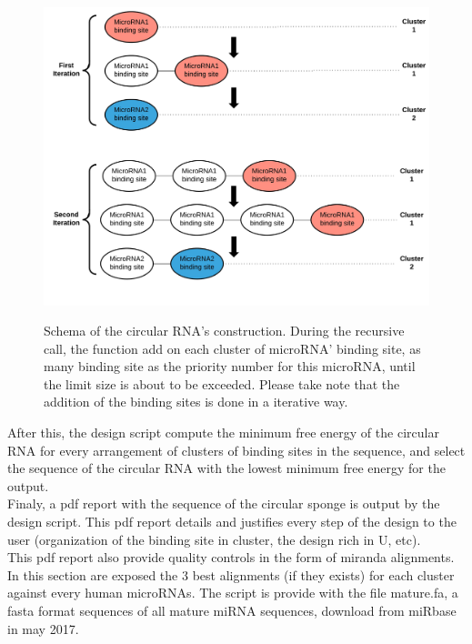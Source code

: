 \documentclass[a4paper,12pt]{report}
\begin{document}
\begin{figure}[H]
	\centering
	{\includegraphics[width=1\textwidth]{circular1(1).jpeg}}
	\caption{Schema of the circular RNA's construction. During the recursive call, the function add on each cluster of microRNA' binding site, as many binding site as the priority number for this microRNA, until the limit size is about to be exceeded. Please take note that the addition of the binding sites is done in a iterative way.}
\end{figure}


After this, the design script compute the minimum free energy of the circular RNA for every arrangement of clusters of binding sites in the sequence, and select the sequence of the circular RNA with the lowest minimum free energy for the output. \\



Finaly, a pdf report with the sequence of the circular sponge is output by the design script. This pdf report details and justifies every step of the design to the user (organization of the binding site in cluster, the design rich in U, etc).\\
This pdf report also provide quality controls in the form of miranda alignments. In this section are exposed the 3 best alignments (if they exists) for each cluster against every human microRNAs. The script is provide with the file mature.fa, a fasta format sequences of all mature miRNA sequences, download from miRbase in may 2017.\\
\end{document}
